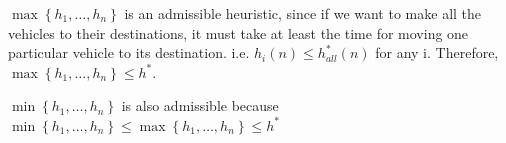\begin{exercise}[Search]
\begin{solution}
\begin{enumerate}
{      $\max \left\{h_{1}, \ldots, h_{n}\right\}$ is an admissible heuristic, since if we want to make all the vehicles to their destinations, it must take at least the time for moving one particular vehicle to its destination. i.e. $h_{i}(n) \le h^{*}_{all}(n)$ for any i. Therefore, $\max \left\{h_{1}, \ldots, h_{n}\right\} \le h^{*}$.

      $\min \left\{h_{1}, \ldots, h_{n}\right\}$ is also admissible because $\min \left\{h_{1}, \ldots, h_{n}\right\} \le \max \left\{h_{1}, \ldots, h_{n}\right\} \le h^{*}$
    }
  \end{enumerate}
  \end{solution}
  \label{ex3}
\end{exercise}

